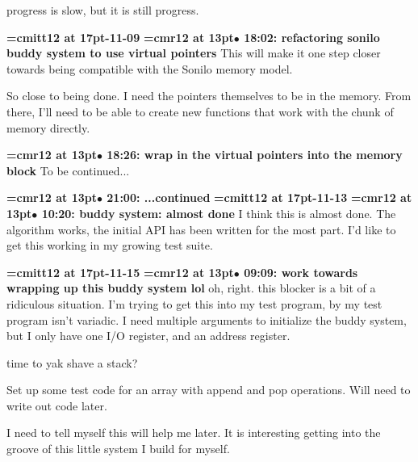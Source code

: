 progress is slow, but it is still progress.
\par

{\medskip\noindent\bf\font\titlefont=cmitt12 at 17pt-11-09}\medskip
{\smallskip\noindent\bf\font\titlefont=cmr12 at 13pt\titlefont $\bullet$ 18:02: refactoring sonilo buddy system to use virtual pointers}\smallskip
This will make it one step closer towards being compatible with the Sonilo memory model.
\par

So close to being done. I need the pointers themselves to be in the memory. From there, I'll need to be able to create new functions that work with the chunk of memory directly.
\par

{\smallskip\noindent\bf\font\titlefont=cmr12 at 13pt\titlefont $\bullet$ 18:26: wrap in the virtual pointers into the memory block}\smallskip
To be continued...
\par

{\smallskip\noindent\bf\font\titlefont=cmr12 at 13pt\titlefont $\bullet$ 21:00: ...continued}\smallskip
{\medskip\noindent\bf\font\titlefont=cmitt12 at 17pt-11-13}\medskip
{\smallskip\noindent\bf\font\titlefont=cmr12 at 13pt\titlefont $\bullet$ 10:20: buddy system: almost done}\smallskip
I think this is almost done. The algorithm works, the initial API has been written for the most part. I'd like to get this working in my growing test suite.
\par

{\medskip\noindent\bf\font\titlefont=cmitt12 at 17pt-11-15}\medskip
{\smallskip\noindent\bf\font\titlefont=cmr12 at 13pt\titlefont $\bullet$ 09:09: work towards wrapping up this buddy system lol}\smallskip
oh, right. this blocker is a bit of a ridiculous situation. I'm trying to get this into my test program, by my test program isn't variadic. I need multiple arguments to initialize the buddy system, but I only have one I/O register, and an address register.
\par

time to yak shave a stack?
\par

Set up some test code for an array with append and pop operations. Will need to write out code later.
\par

I need to tell myself this will help me later. It is interesting getting into the groove of this little system I build for myself.
\par

